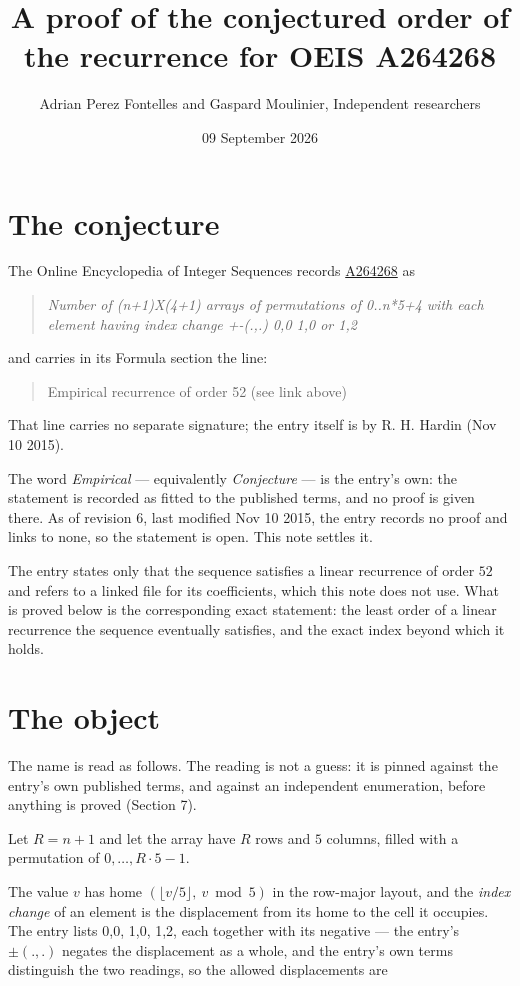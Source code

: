 \documentclass[11pt]{article}
\title{A proof of the conjectured order of the recurrence for OEIS A264268}
\author{Adrian Perez Fontelles and Gaspard Moulinier, Independent researchers}
\date{09 September 2026}
\theoremstyle{definition}
\begin{document}
\maketitle
\section{The conjecture}

The Online Encyclopedia of Integer Sequences records \href{https://oeis.org/A264268}{A264268} as

\begin{quote}\itshape Number of (n+1)X(4+1) arrays of permutations of 0..n*5+4 with each element having index change +-(.,.) 0,0 1,0 or 1,2\end{quote}

and carries in its Formula section the line:

\begin{quote}\ttfamily Empirical recurrence of order 52 (see link above)\end{quote}

That line carries no separate signature; the entry itself is by R. H. Hardin (Nov 10 2015).

The word {\itshape Empirical} --- equivalently {\itshape Conjecture} --- is the entry's own: the statement is recorded as fitted to the published terms, and no proof is given there. As of revision 6, last modified Nov 10 2015, the entry records no proof and links to none, so the statement is open. This note settles it.

The entry states only that the sequence satisfies a linear recurrence of order $52$ and refers to a linked file for its coefficients, which this note does not use. What is proved below is the corresponding exact statement: the least order of a linear recurrence the sequence eventually satisfies, and the exact index beyond which it holds.

\section{The object}

The name is read as follows. The reading is not a guess: it is pinned against the entry's own published terms, and against an independent enumeration, before anything is proved (Section 7).

Let $R = n + 1$ and let the array have $R$ rows and $5$ columns, filled with a permutation of $0,\dots,R\cdot5-1$.

The value $v$ has home $(\lfloor v/5\rfloor,\ v \bmod 5)$ in the row-major layout, and the {\itshape index change} of an element is the displacement from its home to the cell it occupies. The entry lists 0,0, 1,0, 1,2, each together with its negative --- the entry's $\pm(.,.)$ negates the displacement as a whole, and the entry's own terms distinguish the two readings, so the allowed displacements are
\end{document}
